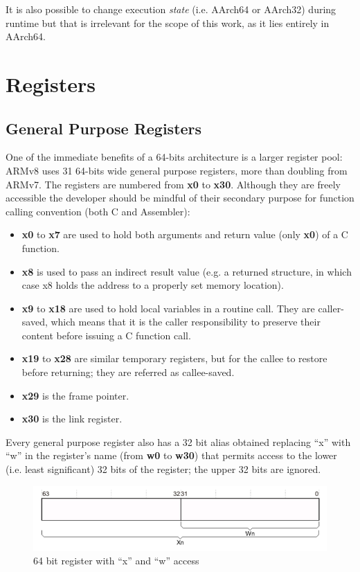\documentclass[12pt,a4paper,openright,twoside]{report}
\begin{document}
It is also possible to change execution \textit{state} (i.e. AArch64 or AArch32)
during runtime but that is irrelevant for the scope of this work, as it lies
entirely in AArch64.

\section{Registers}
\subsection{General Purpose Registers}
One of the immediate benefits of a 64-bits architecture is a larger register pool:
ARMv8 uses 31 64-bits wide general purpose registers, more than doubling from
ARMv7.
The registers are numbered from \textbf{x0} to \textbf{x30}. Although they are
freely accessible the developer should be mindful of their secondary purpose
for function calling convention (both C and Assembler):
\begin{itemize}
    \item \textbf{x0} to \textbf{x7} are used to hold both arguments and return
        value (only \textbf{x0}) of a C function.
    \item \textbf{x8} is used to pass an indirect result value (e.g. a returned 
        structure, in which case x8 holds the address to a properly set memory
        location).
    \item \textbf{x9} to \textbf{x18} are used to hold local variables in a 
        routine call. They are caller-saved, which means that it is the caller
        responsibility to preserve their content before issuing a C function call.
    \item \textbf{x19} to \textbf{x28} are similar temporary registers, but for 
        the callee to restore before returning; they are referred as callee-saved.
    \item \textbf{x29} is the frame pointer.
    \item \textbf{x30} is the link register.
\end{itemize}
Every general purpose register also has a 32 bit alias obtained replacing ``x''
with ``w'' in the register's name (from \textbf{w0} to \textbf{w30}) that permits
access to the lower (i.e. least significant) 32 bits of the register; the upper 
32 bits are ignored.

\begin{figure}[h]
    \begin{center}
\includegraphics[scale=0.55]{images/tesi8.png}
\caption[32 bit alias]{64 bit register with ``x'' and ``w'' access}\label{fig:32reg}
    \end{center}
\end{figure}
\end{document}
